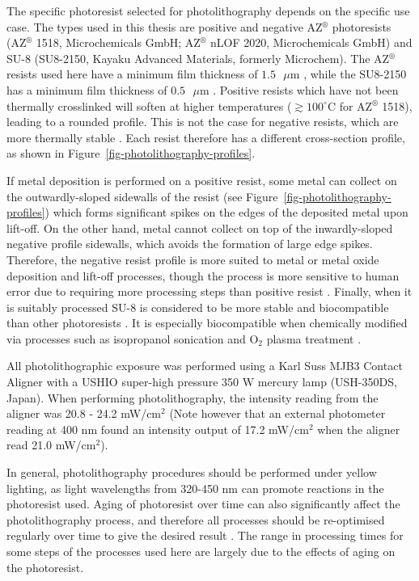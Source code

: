 \documentclass[
  a4paper,
]{scrbook}
\begin{document}
The specific photoresist selected for photolithography depends on the
specific use case. The types used in this thesis are positive and
negative AZ\(^\circledR\) photoresists (AZ\(^\circledR\) 1518,
Microchemicals GmbH; AZ\(^\circledR\) nLOF 2020, Microchemicals GmbH)
and SU-8 (SU8-2150, Kayaku Advanced Materials, formerly Microchem). The
AZ\(^\circledR\) resists used here have a minimum film thickness of
\(1.5\textrm{ } \mu \textrm{m}\) \autocite{Microchemicals}, while the
SU8-2150 has a minimum film thickness of
\(0.5\textrm{ } \mu \textrm{m}\) \autocite{Kayaku}. Positive resists
which have not been thermally crosslinked will soften at higher
temperatures (\(\gtrsim 100^\circ\)C for AZ\(^\circledR\) 1518), leading
to a rounded profile. This is not the case for negative resists, which
are more thermally stable \autocite{Microchemicals}. Each resist
therefore has a different cross-section profile, as shown in
Figure~\ref{fig-photolithography-profiles}.

If metal deposition is performed on a positive resist, some metal can
collect on the outwardly-sloped sidewalls of the resist (see
Figure~\ref{fig-photolithography-profiles}) which forms significant
spikes on the edges of the deposited metal upon lift-off. On the other
hand, metal cannot collect on top of the inwardly-sloped negative
profile sidewalls, which avoids the formation of large edge spikes.
Therefore, the negative resist profile is more suited to metal or metal
oxide deposition and lift-off processes, though the process is more
sensitive to human error due to requiring more processing steps than
positive resist \autocite{Microchemicals}. Finally, when it is suitably
processed SU-8 is considered to be more stable and biocompatible than
other photoresists \autocite{Albarghouthi2022}. It is especially
biocompatible when chemically modified via processes such as isopropanol
sonication and O\(_2\) plasma treatment \autocite{Chen2021}.

All photolithographic exposure was performed using a Karl Suss MJB3
Contact Aligner with a USHIO super-high pressure 350 W mercury lamp
(USH-350DS, Japan). When performing photolithography, the intensity
reading from the aligner was 20.8 - 24.2 mW/cm\(^2\) (Note however that
an external photometer reading at 400 nm found an intensity output of
17.2 mW/cm\(^2\) when the aligner read 21.0 mW/cm\(^2\)).

In general, photolithography procedures should be performed under yellow
lighting, as light wavelengths from 320-450 nm can promote reactions in
the photoresist used. Aging of photoresist over time can also
significantly affect the photolithography process, and therefore all
processes should be re-optimised regularly over time to give the desired
result \autocite{Microchemicals}. The range in processing times for some
steps of the processes used here are largely due to the effects of aging
on the photoresist.
\end{document}
